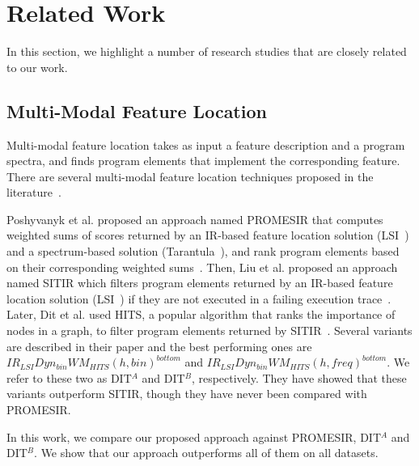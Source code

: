\section{Related Work}
\label{sec.related}

In this section, we highlight a number of research studies that are closely related to our work.

\subsection{Multi-Modal Feature Location} 

Multi-modal feature location takes as input a feature description and a program spectra, and finds program elements that implement the corresponding feature. There are several multi-modal feature location techniques proposed in the literature~\cite{PoshyvanykGMAR07,LiuMPR07,DitRP13}.

Poshyvanyk et al. proposed an approach named PROMESIR that computes weighted sums of scores returned by an IR-based feature location solution (LSI~\cite{MarcusM03}) and a spectrum-based solution (Tarantula~\cite{JH05}), and rank program elements based on their corresponding weighted sums~\cite{PoshyvanykGMAR07}. Then, Liu et al. proposed an approach named SITIR which filters program elements returned by an IR-based feature location solution (LSI~\cite{MarcusM03}) if they are not executed in a failing execution trace~\cite{LiuMPR07}. Later, Dit et al. used HITS, a popular algorithm that ranks the importance of nodes in a graph, to filter program elements returned by SITIR~\cite{DitRP13}.
Several variants are described in their paper and the best performing ones are $IR_{LSI}Dyn_{bin}WM_{HITS}(h,bin)^{bottom}$ and  $IR_{LSI}Dyn_{bin}WM_{HITS}(h,freq)^{bottom}$. We refer to these two as DIT$^A$ and DIT$^B$, respectively. They have showed that these variants outperform SITIR, though they have never been compared with PROMESIR.

In this work, we compare our proposed approach against PROMESIR, DIT$^A$ and DIT$^B$. We show that our approach outperforms all of them on all datasets.

